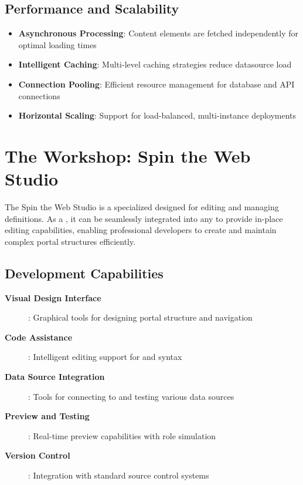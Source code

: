 \subsection{Performance and Scalability}

\begin{itemize}
	\item \textbf{Asynchronous Processing}: Content elements are fetched independently for optimal loading times
	\item \textbf{Intelligent Caching}: Multi-level caching strategies reduce datasource load
	\item \textbf{Connection Pooling}: Efficient resource management for database and API connections
	\item \textbf{Horizontal Scaling}: Support for load-balanced, multi-instance deployments
\end{itemize}

\section{The Workshop: Spin the Web Studio}
\label{sec:workshop-studio}

The Spin the Web Studio is a specialized \webbaselet{} designed for editing and managing \webbase{} definitions. As a \webbaselet{}, it can be seamlessly integrated into any \webbase{} to provide in-place editing capabilities, enabling professional developers to create and maintain complex portal structures efficiently.

\subsection{Development Capabilities}

\begin{description}
\item[\textbf{Visual Design Interface}]: Graphical tools for designing portal structure and navigation
\item[\textbf{Code Assistance}]: Intelligent editing support for \wbdl{} and \wbpl{} syntax
\item[\textbf{Data Source Integration}]: Tools for connecting to and testing various data sources
\item[\textbf{Preview and Testing}]: Real-time preview capabilities with role simulation
\item[\textbf{Version Control}]: Integration with standard source control systems
\end{description}

